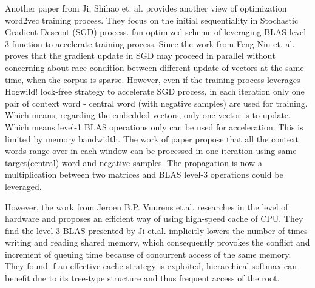 Another paper from Ji, Shihao et. al. \cite{ji2016parallelizing} provides another view of optimization word2vec training process. They focus on the initial sequentiality in Stochastic Gradient Descent (SGD) process. fan optimized scheme of leveraging BLAS level 3 function to accelerate training process. Since the work from Feng Niu et. al. \cite{recht2011hogwild} proves that the gradient update in SGD may proceed in parallel without concerning about race condition between different update of vectors at the same time, when the corpus is sparse. However, even if the training process leverages Hogwild! \cite{recht2011hogwild} lock-free strategy to accelerate SGD process, in each iteration only one pair of context word - central word (with negative samples) are used for training. Which means, regarding the embedded vectors, only one vector is to update. Which means level-1 BLAS operations only can be used for acceleration. This is limited by memory bandwidth. The work of paper propose that all the context words range over in each window can be processed in one iteration using same target(central) word and negative samples. The propagation is now a multiplication between two matrices and BLAS level-3 operations could be leveraged.

However, the work from Jeroen B.P. Vuurens et.al. \cite{eickhoff2016efficient} researches in the level of hardware and proposes an efficient way of using high-speed cache of CPU. They find the level 3 BLAS presented by Ji et.al. implicitly lowers the number of times writing and reading shared memory, which consequently provokes the conflict and increment of queuing time because of concurrent access of the same memory. They found if an effective cache strategy is exploited, hierarchical softmax can benefit due to its tree-type structure and  thus frequent access of the root.
